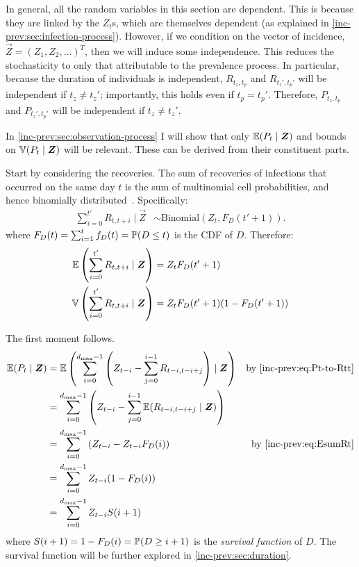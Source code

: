 \documentclass[thesis.tex]{subfiles}
\begin{document}
In general, all the random variables in this section are dependent.
This is because they are linked by the $Z_t$s, which are themselves dependent (as explained in \cref{inc-prev:sec:infection-process}).
However, if we condition on the vector of incidence, $\vec{Z} = (Z_1, Z_2, \dots)^T$, then we will induce some independence.
This reduces the stochasticity to only that attributable to the prevalence process.
In particular, because the duration of individuals is independent, $R_{t_z,t_p}$ and $R_{t_z',t_p'}$ will be independent if $t_z \neq t_z'$; importantly, this holds even if $t_p = t_p'$.
Therefore, $P_{t_z,t_p}$ and $P_{t_z',t_p'}$ will be independent if $t_z \neq t_z'$.

In \cref{inc-prev:sec:observation-process} I will show that only $\operatorname{\mathbb{E}}(P_t \mid \bm{Z})$ and bounds on $\operatorname{\mathbb{V}}(P_t \mid \bm{Z})$ will be relevant.
These can be derived from their constituent parts.

Start by considering the recoveries.
The sum of recoveries of infections that occurred on the same day $t$ is the sum of multinomial cell probabilities, and hence binomially distributed~\autocite{alamAnalysis}.
Specifically:
\begin{align}
  \sum_{i=0}^{t'} R_{t,t+i} \mid \vec{Z} &\sim \text{Binomial}(Z_t, F_D(t'+1)). \label{inc-prev:eq:binomialRt}
\end{align}
where $F_D(t) = \sum_{i=1}^t f_D(t) = \operatorname{\mathbb{P}}(D \leq t)$ is the CDF of $D$.
Therefore:
\begin{align}
  \operatorname{\mathbb{E}} \left( \sum_{i=0}^{t'} R_{t,t+i} \mid \bm{Z} \right) &= Z_t F_D(t'+1) \label{inc-prev:eq:EsumRt} \\
  \operatorname{\mathbb{V}} \left( \sum_{i=0}^{t'} R_{t,t+i} \mid \bm{Z} \right) &= Z_t F_D(t'+1) (1 - F_D(t'+1)) \label{inc-prev:eq:VsumRt}
\end{align}

The first moment follows.
\begin{align}
\E(P_t \mid \vec{Z})
  &= \E\left(\sum_{i=0}^{d_\text{max}-1} \left( Z_{t-i} - \sum_{j=0}^{i-1} R_{t-i,t-i+j} \right) \mid \vec{Z} \right) &\text{by \cref{inc-prev:eq:Pt-to-Rtt}}\\
  &= \sum_{i=0}^{d_\text{max}-1} \left( Z_{t-i} - \sum_{j=0}^{i-1} \E( R_{t-i,t-i+j} \mid \vec{Z}) \right) \\
  &= \sum_{i=0}^{d_\text{max}-1} \left( Z_{t-i} - Z_{t-i} F_D(i) \right) &\text{by \cref{inc-prev:eq:EsumRt}}\\
  &= \sum_{i=0}^{d_\text{max}-1} Z_{t-i} (1 - F_D(i)) \\
  &= \sum_{i=0}^{d_\text{max}-1} Z_{t-i} S(i+1) \label{inc-prev:eq:EPt}
\end{align}
where $S(i+1) = 1-F_D(i) = \operatorname{\mathbb{P}}(D \geq i+1)$ is the \emph{survival function} of $D$.
The survival function will be further explored in \cref{inc-prev:sec:duration}.
\end{document}
